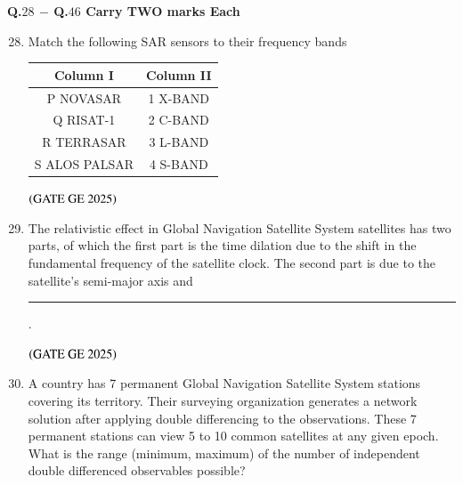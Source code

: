 \documentclass[journal,12pt,onecolumn]{IEEEtran}
\theoremstyle{remark}
\begin{document}
\textbf{Q.$28$ $-$ Q.$46$ Carry TWO marks Each}\\
\begin{enumerate}
\setcounter{enumi}{27}
\item Match the following SAR sensors to their frequency bands
\begin{table}[h]
\centering
\begin{tabular}{|c|c|}
\hline
Column I & Column II \\
\hline
P NOVASAR & 1 X-BAND \\
Q RISAT-1 & 2 C-BAND \\
R TERRASAR & 3 L-BAND \\
S ALOS PALSAR & 4 S-BAND \\
\hline
\end{tabular}
\end{table}
\begin{enumerate}
\end{enumerate}
\hfill $\left(\text{GATE GE 2025}\right)$
\bigskip
\item The relativistic effect in Global Navigation Satellite System satellites has two parts, of which the first part is the time dilation due to the shift in the fundamental frequency of the satellite clock. The second part is due to the satellite's semi-major axis and \rule{2cm}{0.5mm}.
\begin{enumerate}
\end{enumerate}
\hfill $\left(\text{GATE GE 2025}\right)$
\bigskip
\item A country has 7 permanent Global Navigation Satellite System stations covering its territory. Their surveying organization generates a network solution after applying double differencing to the observations. These 7 permanent stations can view 5 to 10 common satellites at any given epoch. What is the range (minimum, maximum) of the number of independent double differenced observables possible?

\end{enumerate}
\end{document}
